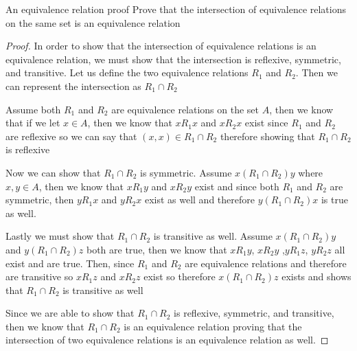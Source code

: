 An equivalence relation proof
Prove that the intersection of equivalence relations on the same set is an equivalence relation

\begin{proof}
In order to show that the intersection of equivalence relations is an equivalence relation, we must show that the intersection is reflexive, symmetric, and transitive. Let us define the two equivalence relations $R_1$ and $R_2$. Then we can represent the intersection as $R_1\cap R_2$

 Assume both $R_1$ and $R_2$ are equivalence relations on the set $A$, then we know that if we let $x\in A$, then we know that $xR_1x$ and $xR_2x$ exist since $R_1$ and $R_2$ are reflexive so we can say that $(x,x)\in R_1\cap R_2$ therefore showing that $R_1\cap R_2$ is reflexive
 
 Now we can show that $R_1\cap R_2$ is symmetric. Assume $x(R_1\cap R_2)y$ where $x,y \in A$, then we know that $xR_1y$ and $xR_2y$ exist and since both $R_1$ and $R_2$ are symmetric, then $yR_1x$ and $yR_2x$ exist as well and therefore $y(R_1\cap R_2)x$ is true as well.
 
 Lastly we must show that $R_1\cap R_2$ is transitive as well. Assume $x(R_1\cap R_2)y$ and $y(R_1\cap R_2)z$ both are true, then we know that $xR_1y$, $xR_2y$ ,$yR_1z$, $yR_2z$ all exist and are true. Then, since $R_1$ and $R_2$ are equivalence relations and therefore are transitive so $xR_1z$ and $xR_2z$ exist so therefore $x(R_1\cap R_2)z$ exists and shows that $R_1\cap R_2$ is transitive as well

Since we are able to show that $R_1\cap R_2$ is reflexive, symmetric, and transitive, then we know that $R_1\cap R_2$ is an equivalence relation proving that the intersection of two equivalence relations is an equivalence relation as well.
\end{proof}